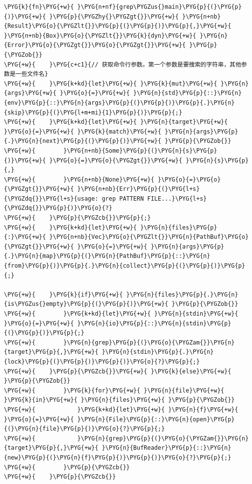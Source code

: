 \begin{Verbatim}[commandchars=\\\{\},breaklines=true,breakanywhere=true,fontsize=\codefont,xleftmargin=17bp]
\PYG{k}{fn}\PYG{+w}{ }\PYG{n+nf}{grep\PYGZus{}main}\PYG{p}{(}\PYG{p}{)}\PYG{+w}{ }\PYG{p}{\PYGZhy{}\PYGZgt{}}\PYG{+w}{ }\PYG{n+nb}{Result}\PYG{o}{\PYGZlt{}}\PYG{p}{(}\PYG{p}{)}\PYG{p}{,}\PYG{+w}{ }\PYG{n+nb}{Box}\PYG{o}{\PYGZlt{}}\PYG{k}{dyn}\PYG{+w}{ }\PYG{n}{Error}\PYG{o}{\PYGZgt{}}\PYG{o}{\PYGZgt{}}\PYG{+w}{ }\PYG{p}{\PYGZob{}}
\PYG{+w}{    }\PYG{c+c1}{// 获取命令行参数。第一个参数是要搜索的字符串，其他参数是一些文件名}
\PYG{+w}{    }\PYG{k+kd}{let}\PYG{+w}{ }\PYG{k}{mut}\PYG{+w}{ }\PYG{n}{args}\PYG{+w}{ }\PYG{o}{=}\PYG{+w}{ }\PYG{n}{std}\PYG{p}{::}\PYG{n}{env}\PYG{p}{::}\PYG{n}{args}\PYG{p}{(}\PYG{p}{)}\PYG{p}{.}\PYG{n}{skip}\PYG{p}{(}\PYG{l+m+mi}{1}\PYG{p}{)}\PYG{p}{;}
\PYG{+w}{    }\PYG{k+kd}{let}\PYG{+w}{ }\PYG{n}{target}\PYG{+w}{ }\PYG{o}{=}\PYG{+w}{ }\PYG{k}{match}\PYG{+w}{ }\PYG{n}{args}\PYG{p}{.}\PYG{n}{next}\PYG{p}{(}\PYG{p}{)}\PYG{+w}{ }\PYG{p}{\PYGZob{}}
\PYG{+w}{        }\PYG{n+nb}{Some}\PYG{p}{(}\PYG{n}{s}\PYG{p}{)}\PYG{+w}{ }\PYG{o}{=}\PYG{o}{\PYGZgt{}}\PYG{+w}{ }\PYG{n}{s}\PYG{p}{,}
\PYG{+w}{        }\PYG{n+nb}{None}\PYG{+w}{ }\PYG{o}{=}\PYG{o}{\PYGZgt{}}\PYG{+w}{ }\PYG{n+nb}{Err}\PYG{p}{(}\PYG{l+s}{\PYGZdq{}}\PYG{l+s}{usage: grep PATTERN FILE...}\PYG{l+s}{\PYGZdq{}}\PYG{p}{)}\PYG{o}{?}
\PYG{+w}{    }\PYG{p}{\PYGZcb{}}\PYG{p}{;}
\PYG{+w}{    }\PYG{k+kd}{let}\PYG{+w}{ }\PYG{n}{files}\PYG{p}{:}\PYG{+w}{ }\PYG{n+nb}{Vec}\PYG{o}{\PYGZlt{}}\PYG{n}{PathBuf}\PYG{o}{\PYGZgt{}}\PYG{+w}{ }\PYG{o}{=}\PYG{+w}{ }\PYG{n}{args}\PYG{p}{.}\PYG{n}{map}\PYG{p}{(}\PYG{n}{PathBuf}\PYG{p}{::}\PYG{n}{from}\PYG{p}{)}\PYG{p}{.}\PYG{n}{collect}\PYG{p}{(}\PYG{p}{)}\PYG{p}{;}

\PYG{+w}{    }\PYG{k}{if}\PYG{+w}{ }\PYG{n}{files}\PYG{p}{.}\PYG{n}{is\PYGZus{}empty}\PYG{p}{(}\PYG{p}{)}\PYG{+w}{ }\PYG{p}{\PYGZob{}}
\PYG{+w}{        }\PYG{k+kd}{let}\PYG{+w}{ }\PYG{n}{stdin}\PYG{+w}{ }\PYG{o}{=}\PYG{+w}{ }\PYG{n}{io}\PYG{p}{::}\PYG{n}{stdin}\PYG{p}{(}\PYG{p}{)}\PYG{p}{;}
\PYG{+w}{        }\PYG{n}{grep}\PYG{p}{(}\PYG{o}{\PYGZam{}}\PYG{n}{target}\PYG{p}{,}\PYG{+w}{ }\PYG{n}{stdin}\PYG{p}{.}\PYG{n}{lock}\PYG{p}{(}\PYG{p}{)}\PYG{p}{)}\PYG{o}{?}\PYG{p}{;}
\PYG{+w}{    }\PYG{p}{\PYGZcb{}}\PYG{+w}{ }\PYG{k}{else}\PYG{+w}{ }\PYG{p}{\PYGZob{}}
\PYG{+w}{        }\PYG{k}{for}\PYG{+w}{ }\PYG{n}{file}\PYG{+w}{ }\PYG{k}{in}\PYG{+w}{ }\PYG{n}{files}\PYG{+w}{ }\PYG{p}{\PYGZob{}}
\PYG{+w}{            }\PYG{k+kd}{let}\PYG{+w}{ }\PYG{n}{f}\PYG{+w}{ }\PYG{o}{=}\PYG{+w}{ }\PYG{n}{File}\PYG{p}{::}\PYG{n}{open}\PYG{p}{(}\PYG{n}{file}\PYG{p}{)}\PYG{o}{?}\PYG{p}{;}
\PYG{+w}{            }\PYG{n}{grep}\PYG{p}{(}\PYG{o}{\PYGZam{}}\PYG{n}{target}\PYG{p}{,}\PYG{+w}{ }\PYG{n}{BufReader}\PYG{p}{::}\PYG{n}{new}\PYG{p}{(}\PYG{n}{f}\PYG{p}{)}\PYG{p}{)}\PYG{o}{?}\PYG{p}{;}
\PYG{+w}{        }\PYG{p}{\PYGZcb{}}
\PYG{+w}{    }\PYG{p}{\PYGZcb{}}


\end{Verbatim}
